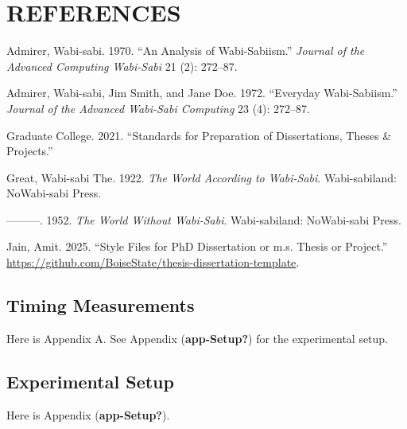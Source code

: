 \documentclass[
  dissertation]{bsu-cs}
\newlength{\cslhangindent}
\newenvironment{CSLReferences}[2] %
 {\begin{list}{}{%
  \setlength{\itemindent}{0pt}
  \setlength{\leftmargin}{0pt}
  \setlength{\parsep}{0pt}
  \ifodd #1
   \setlength{\leftmargin}{\cslhangindent}
   \setlength{\itemindent}{-1\cslhangindent}
  \fi
  \setlength{\itemsep}{#2\baselineskip}}}
 {\end{list}}
\begin{document}
\backmatter



\chapter{REFERENCES}

\label{refs}
\begin{CSLReferences}{1}{0}
Admirer, Wabi-sabi. 1970. {``An Analysis of Wabi-Sabiism.''}
\emph{Journal of the Advanced Computing Wabi-Sabi} 21 (2): 272--87.

Admirer, Wabi-sabi, Jim Smith, and Jane Doe. 1972. {``Everyday
Wabi-Sabiism.''} \emph{Journal of the Advanced Wabi-Sabi Computing} 23
(4): 272--87.

Graduate College. 2021. {``Standards for Preparation of Dissertations,
Theses \& Projects.''}

Great, Wabi-sabi The. 1922. \emph{The World According to Wabi-Sabi}.
Wabi-sabiland: NoWabi-sabi Press.

---------. 1952. \emph{The World Without Wabi-Sabi}. Wabi-sabiland:
NoWabi-sabi Press.

Jain, Amit. 2025. {``Style Files for PhD Dissertation or m.s. Thesis or
Project.''}
\url{https://github.com/BoiseState/thesis-dissertation-template}.

\end{CSLReferences}

\appendix

\section{Timing Measurements}\label{app-Timing}

Here is Appendix A. See Appendix (\textbf{app-Setup?}) for the
experimental setup.

\section{Experimental Setup}\label{app-Setup}

Here is Appendix (\textbf{app-Setup?}).

\finish
\end{document}
